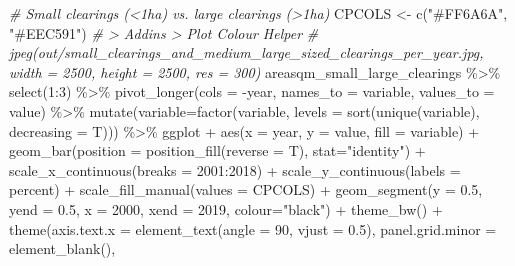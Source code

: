 \documentclass[10pt,landscape,a3paper]{article}
\newenvironment{Shaded}{\begin{snugshade}}{\end{snugshade}}
\newcommand{\AttributeTok}[1]{\textcolor[rgb]{0.77,0.63,0.00}{#1}}
\newcommand{\CommentTok}[1]{\textcolor[rgb]{0.56,0.35,0.01}{\textit{#1}}}
\newcommand{\DecValTok}[1]{\textcolor[rgb]{0.00,0.00,0.81}{#1}}
\newcommand{\FloatTok}[1]{\textcolor[rgb]{0.00,0.00,0.81}{#1}}
\newcommand{\FunctionTok}[1]{\textcolor[rgb]{0.00,0.00,0.00}{#1}}
\newcommand{\NormalTok}[1]{#1}
\newcommand{\OtherTok}[1]{\textcolor[rgb]{0.56,0.35,0.01}{#1}}
\newcommand{\SpecialCharTok}[1]{\textcolor[rgb]{0.00,0.00,0.00}{#1}}
\newcommand{\StringTok}[1]{\textcolor[rgb]{0.31,0.60,0.02}{#1}}
\begin{document}
\begin{Shaded}
\begin{Highlighting}[]
\CommentTok{\# Small clearings (\textless{}1ha) vs. large clearings (\textgreater{}1ha)}
\NormalTok{CPCOLS }\OtherTok{\textless{}{-}} \FunctionTok{c}\NormalTok{(}\StringTok{"\#FF6A6A"}\NormalTok{, }\StringTok{"\#EEC591"}\NormalTok{) }\CommentTok{\# \textgreater{} Addins \textgreater{} Plot Colour Helper}
\CommentTok{\# jpeg(\textquotesingle{}out/small\_clearings\_and\_medium\_large\_sized\_clearings\_per\_year.jpg\textquotesingle{}, width = 2500, height = 2500, res = 300)}
\NormalTok{areasqm\_small\_large\_clearings }\SpecialCharTok{\%\textgreater{}\%} 
  \FunctionTok{select}\NormalTok{(}\DecValTok{1}\SpecialCharTok{:}\DecValTok{3}\NormalTok{) }\SpecialCharTok{\%\textgreater{}\%}
  \FunctionTok{pivot\_longer}\NormalTok{(}\AttributeTok{cols =} \SpecialCharTok{{-}}\NormalTok{year, }\AttributeTok{names\_to =} \StringTok{\textquotesingle{}variable\textquotesingle{}}\NormalTok{, }\AttributeTok{values\_to =} \StringTok{\textquotesingle{}value\textquotesingle{}}\NormalTok{) }\SpecialCharTok{\%\textgreater{}\%} 
  \FunctionTok{mutate}\NormalTok{(}\AttributeTok{variable=}\FunctionTok{factor}\NormalTok{(variable, }\AttributeTok{levels =} \FunctionTok{sort}\NormalTok{(}\FunctionTok{unique}\NormalTok{(variable), }\AttributeTok{decreasing =}\NormalTok{ T))) }\SpecialCharTok{\%\textgreater{}\%}
\NormalTok{  ggplot }\SpecialCharTok{+} \FunctionTok{aes}\NormalTok{(}\AttributeTok{x =}\NormalTok{ year, }\AttributeTok{y =}\NormalTok{ value, }\AttributeTok{fill =}\NormalTok{ variable) }\SpecialCharTok{+} \FunctionTok{geom\_bar}\NormalTok{(}\AttributeTok{position =} \FunctionTok{position\_fill}\NormalTok{(}\AttributeTok{reverse =}\NormalTok{ T), }\AttributeTok{stat=}\StringTok{"identity"}\NormalTok{) }\SpecialCharTok{+}
  \FunctionTok{scale\_x\_continuous}\NormalTok{(}\AttributeTok{breaks =} \DecValTok{2001}\SpecialCharTok{:}\DecValTok{2018}\NormalTok{) }\SpecialCharTok{+} 
  \FunctionTok{scale\_y\_continuous}\NormalTok{(}\AttributeTok{labels =}\NormalTok{ percent) }\SpecialCharTok{+}
  \FunctionTok{scale\_fill\_manual}\NormalTok{(}\AttributeTok{values =}\NormalTok{ CPCOLS) }\SpecialCharTok{+}
  \FunctionTok{geom\_segment}\NormalTok{(}\AttributeTok{y =} \FloatTok{0.5}\NormalTok{, }\AttributeTok{yend =} \FloatTok{0.5}\NormalTok{, }\AttributeTok{x =} \DecValTok{2000}\NormalTok{, }\AttributeTok{xend =} \DecValTok{2019}\NormalTok{, }\AttributeTok{colour=}\StringTok{"black"}\NormalTok{) }\SpecialCharTok{+}
  \FunctionTok{theme\_bw}\NormalTok{() }\SpecialCharTok{+}
  \FunctionTok{theme}\NormalTok{(}\AttributeTok{axis.text.x =} \FunctionTok{element\_text}\NormalTok{(}\AttributeTok{angle =} \DecValTok{90}\NormalTok{, }\AttributeTok{vjust =} \FloatTok{0.5}\NormalTok{), }\AttributeTok{panel.grid.minor =} \FunctionTok{element\_blank}\NormalTok{(),}

\end{Highlighting}
\end{Shaded}
\end{document}
